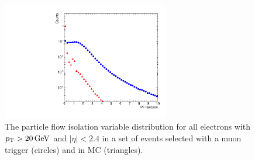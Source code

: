 \begin{figure}[!htbp]
    \centering
    \includegraphics[width=0.65\textwidth]{figures/iso.pdf}
    \caption[
        Distributions of particle flow isolation variables in data and MC.
    ]{
        The particle flow isolation variable distribution for all electrons
        with $p_{\mathrm{T}} > 20 \,\text{Ge\hspace{-.08em}V}$ and $|\eta| < 2.4$ in a set of events selected
        with a muon trigger (circles) and in \MADGRAPH \Ztoee MC (triangles).
    }
    \label{fig:pf_iso}
\end{figure}

